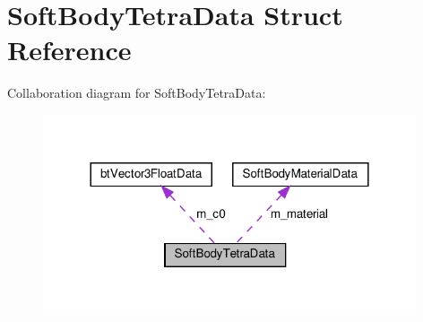 \hypertarget{structSoftBodyTetraData}{}\section{Soft\+Body\+Tetra\+Data Struct Reference}
\label{structSoftBodyTetraData}


Collaboration diagram for Soft\+Body\+Tetra\+Data\+:
\nopagebreak
\begin{figure}[H]
\begin{center}
\leavevmode
\includegraphics[width=312pt]{structSoftBodyTetraData__coll__graph}
\end{center}
\end{figure}

